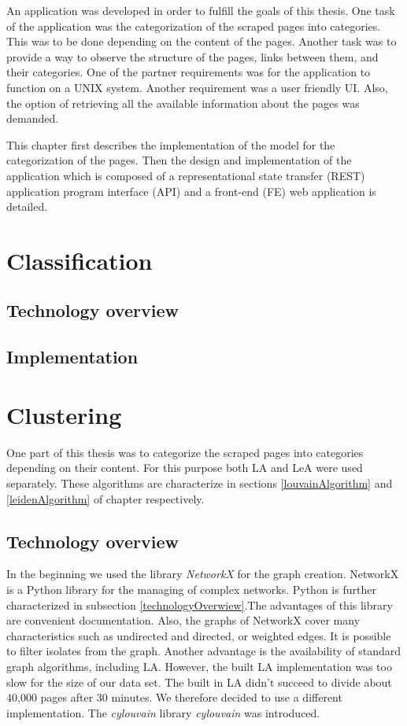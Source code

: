 \label{developmentIntroduction}
An application was developed in order to fulfill the goals of this thesis. One task of the application was the categorization of the scraped pages into categories. This was to be done depending on the content of the pages. Another task was to provide a way to observe the structure of the pages, links between them, and their categories. One of the partner requirements was for the application to function on a UNIX system. Another requirement was a user friendly UI. Also, the option of retrieving all the available information about the pages was demanded. 

This chapter first describes the implementation of the model for the categorization of the pages. Then the design and implementation of the application which is composed of a representational state transfer (REST) application program interface (API) and a front-end (FE) web application is detailed. 

\section{Classification} \label{ClassificationDevelopment}
\subsection{Technology overview} \label{ClassificationTechonologyOverview}
\subsection{Implementation} \label{ClassificationImplementation}

\section{Clustering}\label{ClusteringDevelopment}
One part of this thesis was to categorize the scraped pages into categories depending on their content. For this purpose both LA and LeA were used separately. These algorithms are characterize in sections \ref{louvainAlgorithm} and \ref{leidenAlgorithm} of chapter respectively. 

\subsection{Technology overview} \label{ClusteringTechonologyOverview}
In the beginning we used the library \textit{NetworkX} \cite{networkX} for the graph creation. NetworkX is a Python library for the managing of complex networks. Python is further characterized in subsection \ref{technologyOverwiew}.The advantages of this library are convenient documentation. Also, the graphs of NetworkX cover many characteristics such as undirected and directed, or weighted edges. It is possible to filter isolates from the graph.  Another advantage is the availability of standard graph algorithms, including LA. However, the built LA implementation was too slow for the size of our data set. The built in LA didn't succeed to divide about 40,000 pages after 30 minutes. We therefore decided to use a different implementation. The \textit{cylouvain} library \textit{cylouvain} was introduced. 

